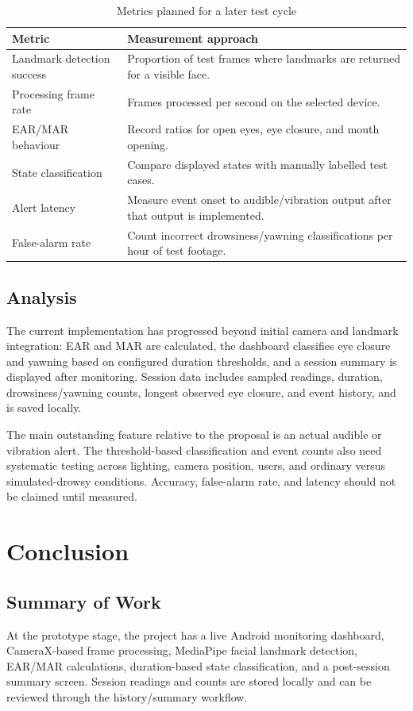 \documentclass{tietreport}
\begin{document}
\begin{table}[H]
\centering
\caption{Metrics planned for a later test cycle}
\begin{tabular}{p{} p{}}
\toprule
\textbf{Metric} & \textbf{Measurement approach} \\
\midrule
Landmark detection success & Proportion of test frames where landmarks are returned for a visible face. \\
Processing frame rate & Frames processed per second on the selected device. \\
EAR/MAR behaviour & Record ratios for open eyes, eye closure, and mouth opening. \\
State classification & Compare displayed states with manually labelled test cases. \\
Alert latency & Measure event onset to audible/vibration output after that output is implemented. \\
False-alarm rate & Count incorrect drowsiness/yawning classifications per hour of test footage. \\
\bottomrule
\end{tabular}
\end{table}

\section{Analysis}
The current implementation has progressed beyond initial camera and landmark integration: EAR and MAR are calculated, the dashboard classifies eye closure and yawning based on configured duration thresholds, and a session summary is displayed after monitoring. Session data includes sampled readings, duration, drowsiness/yawning counts, longest observed eye closure, and event history, and is saved locally.

The main outstanding feature relative to the proposal is an actual audible or vibration alert. The threshold-based classification and event counts also need systematic testing across lighting, camera position, users, and ordinary versus simulated-drowsy conditions. Accuracy, false-alarm rate, and latency should not be claimed until measured.

\chapter{Conclusion}

\section{Summary of Work}
At the prototype stage, the project has a live Android monitoring dashboard, CameraX-based frame processing, MediaPipe facial landmark detection, EAR/MAR calculations, duration-based state classification, and a post-session summary screen. Session readings and counts are stored locally and can be reviewed through the history/summary workflow.
\end{document}
